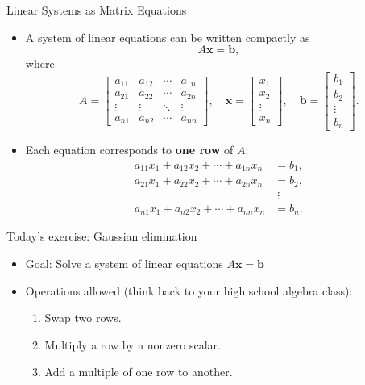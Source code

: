 \documentclass{beamer}
\begin{document}
\begin{frame}[fragile]{Linear Systems as Matrix Equations}

\begin{itemize}
    \item A system of linear equations can be written compactly as
    \[
        A\mathbf{x} = \mathbf{b},
    \]
    where
    \[
    A =
    \begin{bmatrix}
    a_{11} & a_{12} & \cdots & a_{1n}\\
    a_{21} & a_{22} & \cdots & a_{2n}\\
    \vdots & \vdots & \ddots & \vdots\\
    a_{n1} & a_{n2} & \cdots & a_{nn}
    \end{bmatrix},
    \quad
    \mathbf{x} =
    \begin{bmatrix} x_1 \\ x_2 \\ \vdots \\ x_n \end{bmatrix},
    \quad
    \mathbf{b} =
    \begin{bmatrix} b_1 \\ b_2 \\ \vdots \\ b_n \end{bmatrix}.
    \]
    \item Each equation corresponds to \textbf{one row} of \(A\):
    \[
    \begin{aligned}
    a_{11}x_1 + a_{12}x_2 + \cdots + a_{1n}x_n &= b_1,\\
    a_{21}x_1 + a_{22}x_2 + \cdots + a_{2n}x_n &= b_2,\\
    &\;\vdots\\
    a_{n1}x_1 + a_{n2}x_2 + \cdots + a_{nn}x_n &= b_n.
    \end{aligned}
    \]
\end{itemize}
\end{frame}


\begin{frame}[fragile]{Today's exercise: Gaussian elimination}
\begin{itemize}
    \item Goal: Solve a system of linear equations \(A\mathbf{x} = \mathbf{b}\)
    \item Operations allowed (think back to your high school algebra class):
    \begin{enumerate}
        \item Swap two rows.
        \item Multiply a row by a nonzero scalar.
        \item Add a multiple of one row to another.
    \end{enumerate}
\end{itemize}
\end{frame}
\end{document}
